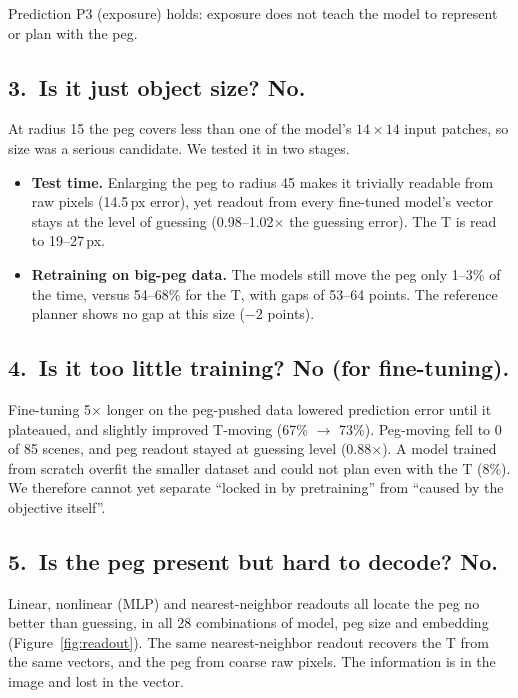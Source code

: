 \documentclass[11pt]{article}
\begin{document}
\begin{verdict}
\small Prediction P3 (exposure) holds: exposure does not teach the model to represent or plan with the peg.
\end{verdict}

\subsection*{3.\ Is it just object size? \textmd{No.}}
At radius 15 the peg covers less than one of the model's $14\times14$ input patches, so size was a serious candidate. We tested it in two stages.
\begin{itemize}
  \item \textbf{Test time.} Enlarging the peg to radius 45 makes it trivially readable from raw pixels (14.5\,px error), yet readout from every fine-tuned model's vector stays at the level of guessing (0.98--1.02$\times$ the guessing error). The T is read to 19--27\,px.
  \item \textbf{Retraining on big-peg data.} The models still move the peg only 1--3\% of the time, versus 54--68\% for the T, with gaps of 53--64 points. The reference planner shows no gap at this size ($-2$ points).
\end{itemize}

\subsection*{4.\ Is it too little training? \textmd{No (for fine-tuning).}}
Fine-tuning 5$\times$ longer on the peg-pushed data lowered prediction error until it plateaued, and slightly improved T-moving (67\% $\to$ 73\%). Peg-moving fell to 0 of 85 scenes, and peg readout stayed at guessing level (0.88$\times$). A model trained from scratch overfit the smaller dataset and could not plan even with the T (8\%). We therefore cannot yet separate ``locked in by pretraining'' from ``caused by the objective itself''.

\subsection*{5.\ Is the peg present but hard to decode? \textmd{No.}}
Linear, nonlinear (MLP) and nearest-neighbor readouts all locate the peg no better than guessing, in all 28 combinations of model, peg size and embedding (Figure~\ref{fig:readout}). The same nearest-neighbor readout recovers the T from the same vectors, and the peg from coarse raw pixels. The information is in the image and lost in the vector.
\end{document}
